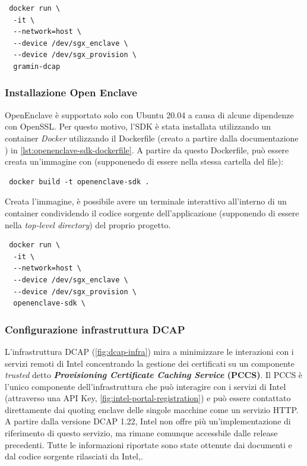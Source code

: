\documentclass{article}
\begin{document}
\begin{verbatim}
 docker run \
  -it \
  --network=host \
  --device /dev/sgx_enclave \ 
  --device /dev/sgx_provision \
  gramin-dcap
\end{verbatim}

\subsubsection{Installazione Open Enclave} OpenEnclave è supportato solo con Ubuntu 20.04 a causa di alcune dipendenze con OpenSSL. Per questo motivo, l'SDK è stata installata utilizzando un container \textit{Docker} utilizzando il Dockerfile (creato a partire dalla documentazione \cite{openenclave}) in \cref{lst:openenclave-sdk-dockerfile}. A partire da questo Dockerfile, può essere creata un'immagine con (supponenedo di essere nella stessa cartella del file):
\begin{verbatim}
 docker build -t openenclave-sdk .
\end{verbatim}



Creata l'immagine, è possibile avere un terminale interattivo all'interno di un container condividendo il codice sorgente dell'applicazione (supponendo di essere nella \textit{top-level directory}) del proprio progetto. 
\begin{verbatim}
 docker run \
  -it \
  --network=host \
  --device /dev/sgx_enclave \ 
  --device /dev/sgx_provision \
  openenclave-sdk \ 
\end{verbatim}

\subsubsection{Configurazione infrastruttura DCAP}\label{sec:dcap-infrastructure-configuration}
L'infrastruttura DCAP (\cref{fig:dcap-infra}) mira a minimizzare le interazioni con i servizi remoti di Intel concentrando la gestione dei certificati su un componente \textit{trusted} detto \textbf{\textit{Provisioning Certificate Caching Service} (PCCS)}. Il PCCS è l'unico componente dell'infrastruttura che può interagire con i servizi di Intel (attraverso una API Key, \cref{fig:intel-portal-registration}) e può essere contattato direttamente dai quoting enclave delle singole macchine come un servizio HTTP. A partire dalla versione DCAP 1.22, Intel non offre più un'implementazione di riferimento di questo servizio, ma rimane comunque accessbile dalle release precedenti. Tutte le informazioni riportate sono state ottenute dai documenti e dal codice sorgente rilasciati da Intel\cite{sgx-dcap-docs},\cite{sgx-dcap-repo}.
\end{document}
